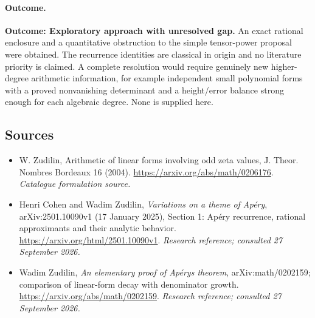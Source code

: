 \documentclass[11pt,a4paper]{article}
\numberwithin{equation}{section}
\begin{document}
\paragraph{Outcome.}
\textbf{Outcome: Exploratory approach with unresolved gap.}
An exact rational enclosure and a quantitative obstruction to the simple tensor-power proposal were obtained. The recurrence identities are classical in origin and no literature priority is claimed. A complete resolution would require genuinely new higher-degree arithmetic information, for example independent small polynomial forms with a proved nonvanishing determinant and a height/error balance strong enough for each algebraic degree. None is supplied here.

\subsection{Sources}
\begin{itemize}\raggedright
\item[\textnormal{[S1]}]\hypertarget{source:statement:1}{} W. Zudilin, Arithmetic of linear forms involving odd zeta values, J. Theor. Nombres Bordeaux 16 (2004).
\url{https://arxiv.org/abs/math/0206176}.
{\small\textit{Catalogue formulation source.}}
\item[\textnormal{[E1]}]\hypertarget{extra:statement:1}{} Henri Cohen and Wadim Zudilin, \emph{Variations on a theme of Ap\'ery}, arXiv:2501.10090v1 (17 January 2025), Section 1: Ap\'ery recurrence, rational approximants and their analytic behavior.
\url{https://arxiv.org/html/2501.10090v1}.
{\small\textit{Research reference; consulted 27 September 2026.}}
\item[\textnormal{[E2]}]\hypertarget{extra:statement:2}{} Wadim Zudilin, \emph{An elementary proof of Ap\'ery\textquotesingle s theorem}, arXiv:math/0202159; comparison of linear-form decay with denominator growth.
\url{https://arxiv.org/abs/math/0202159}.
{\small\textit{Research reference; consulted 27 September 2026.}}
\end{itemize}
\end{document}
